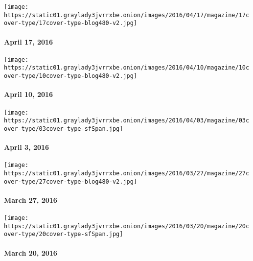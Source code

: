 \href{http://www.nytimes3xbfgragh.onion/indexes/2016/04/17/magazine/index.html}{}

\texttt{[image: https://static01.graylady3jvrrxbe.onion/images/2016/04/17/magazine/17cover-type/17cover-type-blog480-v2.jpg]}

\hypertarget{april-17-2016}{%
\paragraph{April 17, 2016}\label{april-17-2016}}

\href{http://www.nytimes3xbfgragh.onion/indexes/2016/04/11/magazine/index.html}{}

\texttt{[image: https://static01.graylady3jvrrxbe.onion/images/2016/04/10/magazine/10cover-type/10cover-type-blog480-v2.jpg]}

\hypertarget{april-10-2016}{%
\paragraph{April 10, 2016}\label{april-10-2016}}

\href{http://www.nytimes3xbfgragh.onion/indexes/2016/04/03/magazine/index.html}{}

\texttt{[image: https://static01.graylady3jvrrxbe.onion/images/2016/04/03/magazine/03cover-type/03cover-type-sfSpan.jpg]}

\hypertarget{april-3-2016}{%
\paragraph{April 3, 2016}\label{april-3-2016}}

\href{http://www.nytimes3xbfgragh.onion/indexes/2016/03/27/magazine/index.html}{}

\texttt{[image: https://static01.graylady3jvrrxbe.onion/images/2016/03/27/magazine/27cover-type/27cover-type-blog480-v2.jpg]}

\hypertarget{march-27-2016}{%
\paragraph{March 27, 2016}\label{march-27-2016}}

\href{http://www.nytimes3xbfgragh.onion/indexes/2016/03/20/magazine/index.html}{}

\texttt{[image: https://static01.graylady3jvrrxbe.onion/images/2016/03/20/magazine/20cover-type/20cover-type-sfSpan.jpg]}

\hypertarget{march-20-2016}{%
\paragraph{March 20, 2016}\label{march-20-2016}}

